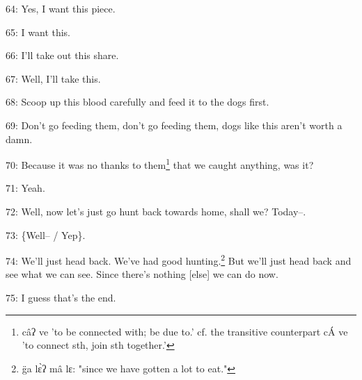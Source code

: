 64: Yes, I want this piece.

65: I want this.

66: I'll take out this share.

67: Well, I'll take this.

68: Scoop up this blood carefully and feed it to the dogs first.

69: Don't go feeding them, don't go feeding them, dogs like this aren't worth a
damn.

70: Because it was no thanks to them\footnote{câʔ ve 'to be connected with; be due to.' cf. the transitive counterpart cÁ ve 'to connect sth, join sth together.'} that we caught anything, was it?

71: Yeah.

72: Well, now let's just go hunt back towards home, shall we? Today--.

73: \{Well-- / Yep\}.

74: We'll just head back. We've had good hunting.\footnote{g̈a lɛ̀ʔ mâ lɛ: "since we have gotten a lot to eat."} But we'll just head back
and see what we can see. Since there's nothing [else] we can do now.

75: I guess that's the end.


